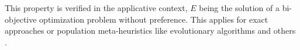 \documentclass{meta}
\def\RR{{\mathbb{R}}}
\newtheorem{prop}{Proposition}
\begin{document}



% 
% 
% 
% 
This property  is verified in the applicative context, $E$ being the solution of a bi-objective optimization problem without preference.
This applies for 
exact approaches or population meta-heuristics like evolutionary algorithms and others \cite{talbi2012multi}.


% 
% 


% 
\end{document}
